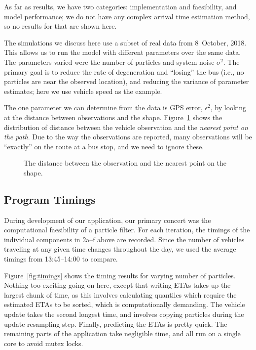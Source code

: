 As far as results, we have two categories:
implementation and faesibility,
and model performance;
we do not have any complex arrival time estimation method,
so no results for that are shown here.


The simulations we discuss here use a subset of real data from 8~October, 2018.
This allows us to run the model with different parameters over the same data.
The parameters varied were the number of particles and system noise $\sigma^2$.
The primary goal is to reduce the rate of degeneration and ``losing'' the bus 
(i.e., no particles are near the observed location),
and reducing the variance of parameter estimates; here we use vehicle speed as the example.


The one parameter we can determine from the data is GPS error, $\epsilon^2$,
by looking at the distance between observations and the shape.
Figure~\ref{fig:gps_dist} shows the distribution of distance between the vehicle
observation and the \emph{nearest point on the path}.
Due to the way the observations are reported, 
many observations will be ``exactly'' on the route at a bus stop,
and we need to ignore these.

\begin{figure}[tb]
    \centering
    \caption{The distance between the observation and the nearest point on the shape.}
    \label{fig:gps_dist}
\end{figure}



\subsection{Program Timings}
\label{sec:timings}

During development of our application,
our primary concert was the computational faesibility of a particle filter.
For each iteration, 
the timings of the individual components in 2a--f above are recorded.
Since the number of vehicles traveling at any given time changes throughout the day,
we used the average timings from 13:45--14:00 to compare.


Figure~\ref{fig:timings} shows the timing results for varying number of particles.
Nothing too exciting going on here, 
except that writing ETAs takes up the largest chunk of time,
as this involves calculating quantiles which require the estimated ETAs to be sorted,
which is computationally demanding. 
The vehicle update takes the second longest time,
and involves copying particles during the update resampling step.
Finally, predicting the ETAs is pretty quick.
The remaining parts of the application take negligible time,
and all run on a single core to avoid mutex locks.



